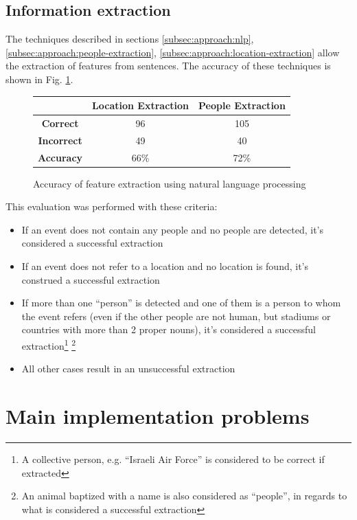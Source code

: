 \documentclass{llncs}
\begin{document}
\subsection{Information extraction}

The techniques described in sections \ref{subsec:approach:nlp}, \ref{subsec:approach:people-extraction}, \ref{subsec:approach:location-extraction} allow the extraction of features from sentences. The accuracy of these techniques is shown in Fig. \ref{fig:classifier-accuracy}.

\begin{figure}[h!]
	\centering
	\begin{tabular}{c|c|c}
		& \textbf{Location Extraction} & \textbf{People Extraction} \\
		\hline
		\textbf{Correct}   & 96 & 105 \\
		\textbf{Incorrect} & 49 & 40 \\
		\hline
		\textbf{Accuracy}  & 66\% & 72\% \\ 
	\end{tabular}
	\caption{Accuracy of feature extraction using natural language processing}
	\label{fig:classifier-accuracy}
\end{figure}

This evaluation was performed with these criteria:

\begin{itemize}
	\item If an event does not contain any people and no people are detected, it's considered a successful extraction
	\item If an event does not refer to a location and no location is found, it's construed a successful extraction
	\item If more than one ``person'' is detected and one of them is a person to whom the event refers (even if the other people are not human, but stadiums or countries with more than 2 proper nouns), it's considered a successful extraction\footnote{A collective person, e.g. ``Israeli Air Force'' is considered to be correct if extracted} \footnote{An animal baptized with a name is also considered as ``people'', in regards to what is considered a successful extraction}
	\item All other cases result in an unsuccessful extraction
\end{itemize}

\section{Main implementation problems}
\end{document}
